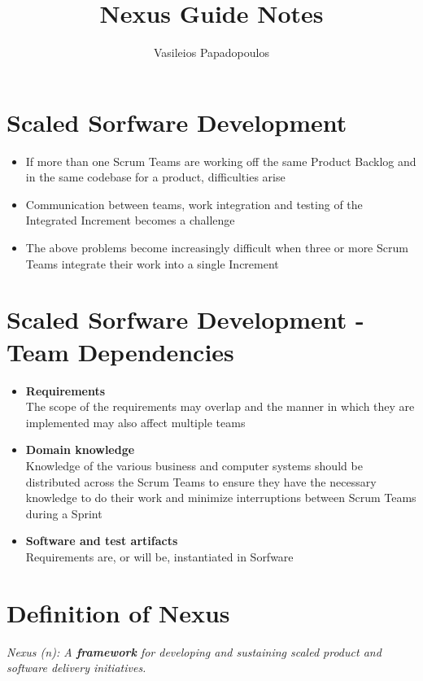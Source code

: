 \documentclass[a4paper,11pt,twocolumn]{article}
\title{\textbf{Nexus Guide Notes} \vspace{-2ex}}
\author{Vasileios Papadopoulos}
\date{}
\begin{document}
\maketitle

\thispagestyle{fancy}

\section*{Scaled Sorfware Development}
\begin{itemize}
	\item If more than one Scrum Teams are working off the same Product Backlog and in the same codebase for a product, difficulties arise
	\item Communication between teams, work integration and testing of the Integrated Increment becomes a challenge
	\item The above problems become increasingly difficult when three or more Scrum Teams integrate their work into a single Increment
\end{itemize}

\section*{Scaled Sorfware Development - Team Dependencies}
\begin{itemize}
	\item \textbf{Requirements}\\
	The scope of the requirements may overlap and the manner in which they are implemented may also affect multiple teams
	\item \textbf{Domain knowledge}\\
	Knowledge of the various business and computer systems should be distributed across the Scrum Teams to ensure they have the necessary knowledge to do their work and minimize interruptions between Scrum Teams during a Sprint
	\item \textbf{Software and test artifacts}\\
	Requirements are, or will be, instantiated in Sorfware
\end{itemize}

\section*{Definition of Nexus}
\textit{Nexus (n): A \textbf{framework} for developing and sustaining scaled product and software delivery initiatives.}
\end{document}
